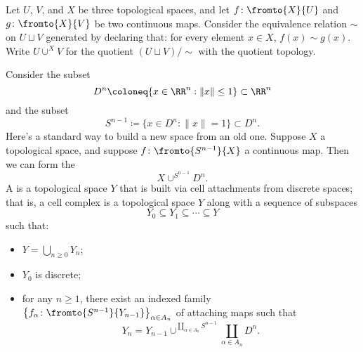 \begin{exm}
	Let $U$, $V$, and $X$ be three topological spaces, and let $f\colon\fromto{X}{U}$ and $g\colon\fromto{X}{V}$ be two continuous maps.
	Consider the equivalence relation $\sim$ on $U\sqcup V$ generated by declaring that:
	for every element $x\in X$, $f(x) \sim g(x)$.
	Write $U \cup^X V$ for the quotient $(U\sqcup V)/\sim$ with the quotient topology.

	Consider the subset
	\[D^{n}\coloneq\{x\in\RR^{n} : \|x\|\leq 1\}\subset\RR^{n}\]
	and the subset
	\[S^{n-1}\coloneq\{x\in D^{n} : \|x\|=1\}\subset D^{n}.\]
	Here's a standard way to build a new space from an old one. Suppose $X$ a topological space, and suppose $f\colon\fromto{S^{n-1}}{X}$ a continuous map. Then we can form the 
	\[
		X\cup^{S^{n-1}}D^n.
	\]
	A  is a topological space $Y$ that is built via cell attachments from discrete spaces; that is, a cell complex is a topological space $Y$ along with a sequence of subspaces
	\[
		Y_0\subseteq Y_1\subseteq \cdots\subseteq Y
	\]
	such that:
	\begin{itemize}
		\item $Y=\bigcup_{n\geq 0}Y_n$;
		\item $Y_0$ is discrete;
		\item for any $n\geq 1$, there exist an indexed family $\left\{f_{\alpha}\colon\fromto{S^{n-1}}{Y_{n-1}}\right\}_{\alpha\in A_n}$ of attaching maps such that
	\[
		Y_n=Y_{n-1}\cup^{\coprod_{\alpha\in A_n}S^{n-1}}\coprod_{\alpha\in A_n}D^{n}.
	\]
	\end{itemize}
\end{exm}


